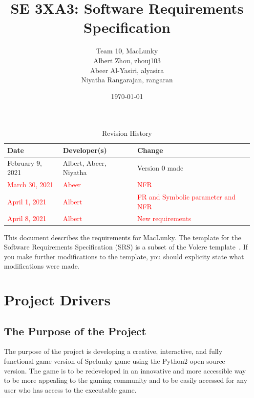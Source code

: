 \documentclass[12pt, titlepage]{article}
\title{SE 3XA3: Software Requirements Specification}
\author{Team 10, MacLunky
		\\ Albert Zhou, zhouj103
		\\Abeer Al-Yasiri, alyasira
		\\ Niyatha Rangarajan, rangaran
}
\date{\today}
\begin{document}
\maketitle

\tableofcontents
\listoftables
\listoffigures

\begin{table}[hp]
\caption{Revision History} \label{TblRevisionHistory}
\begin{tabularx}{\textwidth}{llX}
\toprule
\textbf{Date} & \textbf{Developer(s)} & \textbf{Change}\\
\midrule
February 9, 2021 & Albert, Abeer, Niyatha & Version 0 made\\
\hline
\textcolor{red}{March 30, 2021} & \textcolor{red}{Abeer}& \textcolor{red}{NFR}\\
\hline
\textcolor{red}{April 1, 2021} & \textcolor{red}{Albert} & \textcolor{red}{FR and Symbolic parameter and NFR}\\
\hline
\textcolor{red}{April 8, 2021} & \textcolor{red}{Albert} & \textcolor{red}{New requirements}\\
\bottomrule
\end{tabularx}
\end{table}

\newpage


This document describes the requirements for MacLunky. The template for the Software Requirements Specification (SRS) is a subset of the Volere template~\citep{RobertsonAndRobertson2012}. If you make further modifications to the template, you should explicity state what modifications were made.

\section{Project Drivers}

\subsection{The Purpose of the Project}

The purpose of the project is developing a creative, interactive, and fully functional game version of Spelunky game using the Python2 open source version. The game is to be redeveloped in an innovative and more accessible way to be more appealing to the gaming community and to be easily accessed for any user who has access to the executable game. 
\end{document}
